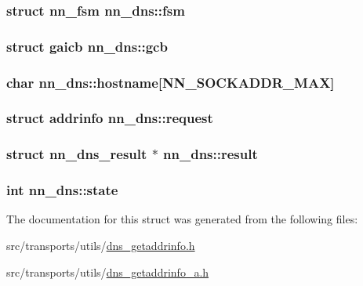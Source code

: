 \subsubsection[{fsm}]{\setlength{\rightskip}{0pt plus 5cm}struct {\bf nn\+\_\+fsm} nn\+\_\+dns\+::fsm}\hypertarget{structnn__dns_a0f2f987efe48894f96a30199fbbf08d9}{}\label{structnn__dns_a0f2f987efe48894f96a30199fbbf08d9}
\subsubsection[{gcb}]{\setlength{\rightskip}{0pt plus 5cm}struct gaicb nn\+\_\+dns\+::gcb}\hypertarget{structnn__dns_ab81aea732ded93810fdf265eb2f257ea}{}\label{structnn__dns_ab81aea732ded93810fdf265eb2f257ea}
\subsubsection[{hostname}]{\setlength{\rightskip}{0pt plus 5cm}char nn\+\_\+dns\+::hostname\mbox{[}{\bf N\+N\+\_\+\+S\+O\+C\+K\+A\+D\+D\+R\+\_\+\+M\+AX}\mbox{]}}\hypertarget{structnn__dns_aa9b2b6de4e2ac1e18876370ada8c8a7a}{}\label{structnn__dns_aa9b2b6de4e2ac1e18876370ada8c8a7a}
\subsubsection[{request}]{\setlength{\rightskip}{0pt plus 5cm}struct addrinfo nn\+\_\+dns\+::request}\hypertarget{structnn__dns_aa16cc1ee1b29647de32a28ff2abe9ed3}{}\label{structnn__dns_aa16cc1ee1b29647de32a28ff2abe9ed3}
\subsubsection[{result}]{\setlength{\rightskip}{0pt plus 5cm}struct {\bf nn\+\_\+dns\+\_\+result} $\ast$ nn\+\_\+dns\+::result}\hypertarget{structnn__dns_a379539bb0b7354a8520acb23fdaac027}{}\label{structnn__dns_a379539bb0b7354a8520acb23fdaac027}
\subsubsection[{state}]{\setlength{\rightskip}{0pt plus 5cm}int nn\+\_\+dns\+::state}\hypertarget{structnn__dns_a95a661cf2fc34d5dcb28bada51eee803}{}\label{structnn__dns_a95a661cf2fc34d5dcb28bada51eee803}


The documentation for this struct was generated from the following files\+:\begin{DoxyCompactItemize}
\item 
src/transports/utils/\hyperlink{dns__getaddrinfo_8h}{dns\+\_\+getaddrinfo.\+h}\item 
src/transports/utils/\hyperlink{dns__getaddrinfo__a_8h}{dns\+\_\+getaddrinfo\+\_\+a.\+h}\end{DoxyCompactItemize}
